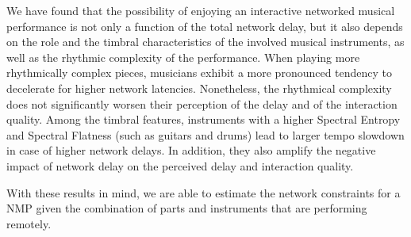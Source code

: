 We have found that the possibility of enjoying an interactive networked musical performance is not only a function of the total network delay, but it also depends on the role and the timbral characteristics of the involved musical instruments, as well as the rhythmic complexity of the performance. When playing more rhythmically complex pieces, musicians exhibit a more pronounced tendency to decelerate for higher network latencies. Nonetheless, the rhythmical complexity does not significantly worsen their perception of the delay and of the interaction quality.
Among the timbral features, instruments with a higher Spectral Entropy and Spectral Flatness (such as guitars and drums) lead to larger tempo slowdown in case of higher network delays. In addition, they also amplify the negative impact of network delay on the perceived delay and interaction quality.

With these results in mind, we are able to estimate the network constraints for a NMP given the combination of parts and instruments that are performing remotely.

%




